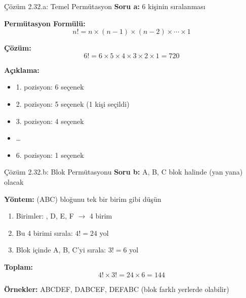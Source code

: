 \documentclass[light]{lutbeamer}
\begin{document}
\begin{frame}{Çözüm 2.32.a: Temel Permütasyon}
    \color{blue}
    \textbf{Soru a:} 6 kişinin sıralanması
    
    \vspace{0.3cm}
    \textbf{Permütasyon Formülü:}
    \[ n! = n \times (n-1) \times (n-2) \times \cdots \times 1 \]
    
    \vspace{0.3cm}
    \textbf{Çözüm:}
    \[ 6! = 6 \times 5 \times 4 \times 3 \times 2 \times 1 = 720 \]
    
    \vspace{0.3cm}
    \textbf{Açıklama:}
    \begin{itemize}
        \item 1. pozisyon: 6 seçenek
        \item 2. pozisyon: 5 seçenek (1 kişi seçildi)
        \item 3. pozisyon: 4 seçenek
        \item \ldots
        \item 6. pozisyon: 1 seçenek
    \end{itemize}
    
    \begin{center}
    \end{center}
\end{frame}

\begin{frame}{Çözüm 2.32.b: Blok Permütasyonu}
    \color{blue}
    \textbf{Soru b:} A, B, C blok halinde (yan yana) olacak
    
    \vspace{0.3cm}
    \textbf{Yöntem:} (ABC) bloğunu tek bir birim gibi düşün
    
    \begin{enumerate}
        \item Birimler: , D, E, F $\rightarrow$ 4 birim
        \item Bu 4 birimi sırala: $4! = 24$ yol
        \item Blok içinde A, B, C'yi sırala: $3! = 6$ yol
    \end{enumerate}
    
    \vspace{0.3cm}
    \textbf{Toplam:}
    \[ 4! \times 3! = 24 \times 6 = 144 \]
    
    \vspace{0.3cm}
    \textbf{Örnekler:} ABCDEF, DABCEF, DEFABC (blok farklı yerlerde olabilir)
    
    \begin{center}
    \end{center}
\end{frame}
\end{document}
